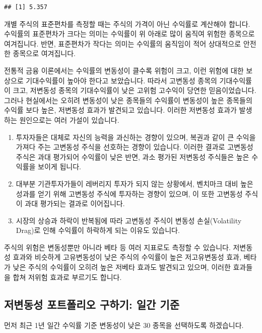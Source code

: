 \documentclass[12pt,]{book}
\providecommand{\tightlist}{%
  \setlength{\itemsep}{0pt}\setlength{\parskip}{0pt}}
\begin{document}
\begin{verbatim}
## [1] 5.357
\end{verbatim}

개별 주식의 표준편차를 측정할 때는 주식의 가격이 아닌 수익률로 계산해야 합니다. 수익률의 표준편차가 크다는 의미는 수익률이 위 아래로 많이 움직여 위험한 종목으로 여겨집니다. 반면, 표준편차가 작다는 의미는 수익률의 움직임이 적어 상대적으로 안전한 종목으로 여겨집니다.

전통적 금융 이론에서는 수익률의 변동성이 클수록 위험이 크고, 이런 위험에 대한 보상으로 기대수익률이 높아야 한다고 보았습니다. 따라서 고변동성 종목의 기대수익률이 크고, 저변동성 종목의 기대수익률이 낮은 고위험 고수익이 당연한 믿음이었습니다. 그러나 현실에서는 오히려 변동성이 낮은 종목들의 수익률이 변동성이 높은 종목들의 수익률 보다 높은, 저변동성 효과가 발견되고 있습니다. 이러한 저변동성 효과가 발생하는 원인으로는 여러 가설이 있습니다.

\begin{enumerate}
\def\labelenumi{\arabic{enumi}.}
\tightlist
\item
  투자자들은 대체로 자신의 능력을 과신하는 경향이 있으며, 복권과 같이 큰 수익을 가져다 주는 고변동성 주식을 선호하는 경향이 있습니다. 이러한 결과로 고변동성 주식은 과대 평가되어 수익률이 낮은 반면, 과소 평가된 저변동성 주식들은 높은 수익률을 보이게 됩니다.
\item
  대부분 기관투자가들이 레버리지 투자가 되지 않는 상황에서, 벤치마크 대비 높은 성과를 얻기 위해 고변동성 주식에 투자하는 경향이 있으며, 이 또한 고변동성 주식이 과대 평가되는 결과로 이어집니다.
\item
  시장의 상승과 하락이 반복됨에 따라 고변동성 주식이 변동성 손실(Volatility Drag)로 인해 수익률이 하락하게 되는 이유도 있습니다.
\end{enumerate}

주식의 위험은 변동성뿐만 아니라 베타 등 여러 지표로도 측정할 수 있습니다. 저변동성 효과와 비슷하게 고유변동성이 낮은 주식의 수익률이 높은 저고유변동성 효과, 베타가 낮은 주식의 수익률이 오히려 높은 저베타 효과도 발견되고 있으며, 이러한 효과들을 합쳐 저위험 효과로 부르기도 합니다.

\hypertarget{section-50}{%
\subsection{저변동성 포트폴리오 구하기: 일간 기준}\label{section-50}}

먼저 최근 1년 일간 수익률 기준 변동성이 낮은 30 종목을 선택하도록 하겠습니다.
\end{document}
